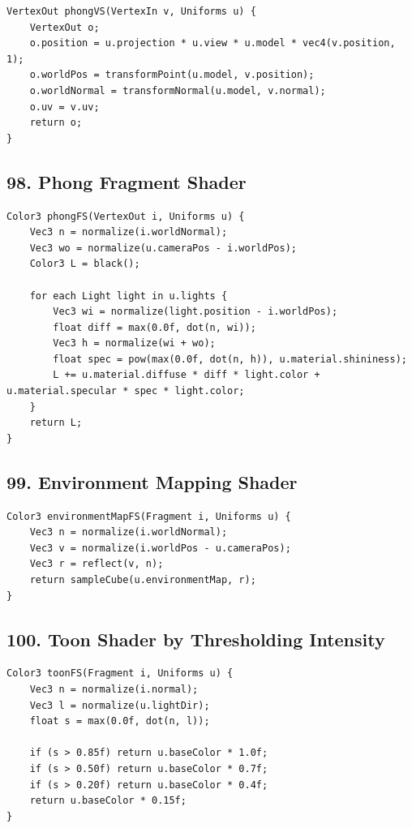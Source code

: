 \documentclass[10pt,letterpaper]{article}
\begin{document}
\begin{verbatim}
VertexOut phongVS(VertexIn v, Uniforms u) {
    VertexOut o;
    o.position = u.projection * u.view * u.model * vec4(v.position, 1);
    o.worldPos = transformPoint(u.model, v.position);
    o.worldNormal = transformNormal(u.model, v.normal);
    o.uv = v.uv;
    return o;
}
\end{verbatim}

\subsection{98. Phong Fragment Shader}

\begin{verbatim}
Color3 phongFS(VertexOut i, Uniforms u) {
    Vec3 n = normalize(i.worldNormal);
    Vec3 wo = normalize(u.cameraPos - i.worldPos);
    Color3 L = black();

    for each Light light in u.lights {
        Vec3 wi = normalize(light.position - i.worldPos);
        float diff = max(0.0f, dot(n, wi));
        Vec3 h = normalize(wi + wo);
        float spec = pow(max(0.0f, dot(n, h)), u.material.shininess);
        L += u.material.diffuse * diff * light.color + u.material.specular * spec * light.color;
    }
    return L;
}
\end{verbatim}

\subsection{99. Environment Mapping Shader}

\begin{verbatim}
Color3 environmentMapFS(Fragment i, Uniforms u) {
    Vec3 n = normalize(i.worldNormal);
    Vec3 v = normalize(i.worldPos - u.cameraPos);
    Vec3 r = reflect(v, n);
    return sampleCube(u.environmentMap, r);
}
\end{verbatim}

\subsection{100. Toon Shader by Thresholding Intensity}

\begin{verbatim}
Color3 toonFS(Fragment i, Uniforms u) {
    Vec3 n = normalize(i.normal);
    Vec3 l = normalize(u.lightDir);
    float s = max(0.0f, dot(n, l));

    if (s > 0.85f) return u.baseColor * 1.0f;
    if (s > 0.50f) return u.baseColor * 0.7f;
    if (s > 0.20f) return u.baseColor * 0.4f;
    return u.baseColor * 0.15f;
}
\end{verbatim}
\end{document}
